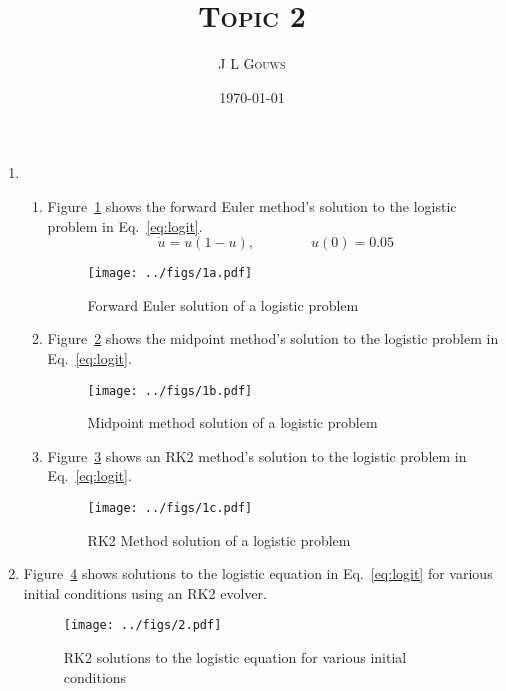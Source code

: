 \documentclass[12pt,a4]{article}
\title{
\textsc{Topic 2}
}
\author{\textsc{J L Gouws}
}
\date{\today
\\[1cm]}
\begin{document}
\thispagestyle{empty}

\maketitle

\begin{enumerate}
  \item
    \begin{enumerate}
      \item
        Figure~\ref{fig:1a} shows the forward Euler method's solution to the logistic problem in Eq.~\ref{eq:logit}.
        \begin{equation}
          \dot u = u (1 - u), \qquad \qquad u(0) = 0.05
          \label{eq:logit}
        \end{equation}
        \begin{figure}[H]
          \centering
          \texttt{[image: ../figs/1a.pdf]}
          \caption{Forward Euler solution of a logistic problem}
          \label{fig:1a}
        \end{figure}

      \item
        Figure~\ref{fig:1b} shows the midpoint method's solution to the logistic problem in Eq.~\ref{eq:logit}.

        \begin{figure}[H]
          \centering
          \texttt{[image: ../figs/1b.pdf]}
          \caption{Midpoint method solution of a logistic problem}
          \label{fig:1b}
        \end{figure}

      \item
        Figure~\ref{fig:1c} shows an RK2 method's solution to the logistic problem in Eq.~\ref{eq:logit}.
        \begin{figure}[H]
          \centering
          \texttt{[image: ../figs/1c.pdf]}
          \caption{RK2 Method solution of a logistic problem}
          \label{fig:1c}
        \end{figure}

    \end{enumerate}
  \item
    Figure~\ref{fig:2} shows solutions to the logistic equation in Eq.~\ref{eq:logit} for various initial conditions using an RK2 evolver.
    \begin{figure}[H]
      \centering
      \texttt{[image: ../figs/2.pdf]}
      \caption{RK2 solutions to the logistic equation for various initial conditions}
      \label{fig:2}
    \end{figure}


\end{enumerate}
\end{document}
